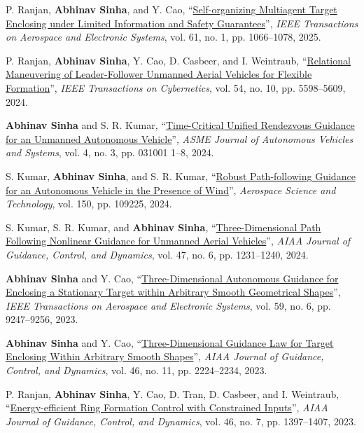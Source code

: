 \begin{etaremune}[leftmargin=1cm]
		\item P. Ranjan, \textbf{Abhinav Sinha}, and Y. Cao, ``\href{https://ieeexplore.ieee.org/document/10660561}{Self-organizing Multiagent Target Enclosing under Limited Information and Safety Guarantees}'', \emph{IEEE Transactions on Aerospace and Electronic Systems}, vol. 61, no. 1, pp. 1066--1078, 2025.
		\item P. Ranjan, \textbf{Abhinav Sinha}, Y. Cao, D. Casbeer, and I. Weintraub, ``\href{https://ieeexplore.ieee.org/abstract/document/10634571}{Relational Maneuvering of Leader-Follower Unmanned Aerial Vehicles for Flexible Formation}'', \emph{IEEE Transactions on Cybernetics}, vol. 54, no. 10, pp. 5598--5609, 2024.
		\item \textbf{Abhinav Sinha} and S. R. Kumar, ``\href{https://asmedigitalcollection.asme.org/autonomousvehicles/article-abstract/4/3/031001/1203074/Time-Critical-Unified-Rendezvous-Guidance-for-an?redirectedFrom=fulltext}{Time-Critical Unified Rendezvous Guidance for an Unmanned Autonomous Vehicle}'', \emph{ASME Journal of Autonomous Vehicles and Systems}, vol. 4, no. 3, pp. 031001 1--8, 2024.
		\item S. Kumar, \textbf{Abhinav Sinha}, and S. R. Kumar, ``\href{https://www.sciencedirect.com/science/article/abs/pii/S1270963824003560}{Robust Path-following Guidance for an Autonomous Vehicle in the Presence of Wind}'', \emph{Aerospace Science and Technology}, vol. 150, pp. 109225, 2024.
		\item S. Kumar, S. R. Kumar, and \textbf{Abhinav Sinha}, ``\href{https://arc.aiaa.org/doi/abs/10.2514/1.G007964}{Three-Dimensional Path Following Nonlinear Guidance for Unmanned Aerial Vehicles}'', \emph{AIAA Journal of Guidance, Control, and Dynamics}, vol. 47, no. 6, pp. 1231--1240, 2024.
		\item \textbf{Abhinav Sinha} and Y. Cao, ``\href{https://ieeexplore.ieee.org/document/10251969}{Three-Dimensional Autonomous Guidance for Enclosing a Stationary Target within Arbitrary Smooth Geometrical Shapes}'', \emph{IEEE Transactions on Aerospace and Electronic Systems}, vol. 59, no. 6, pp. 9247--9256, 2023.
		\item \textbf{Abhinav Sinha} and Y. Cao, ``\href{https://arc.aiaa.org/doi/abs/10.2514/1.G007539}{Three-Dimensional Guidance Law for Target Enclosing Within Arbitrary Smooth Shapes}'', \emph{AIAA Journal of Guidance, Control, and Dynamics}, vol. 46, no. 11, pp. 2224--2234, 2023.
		\item P. Ranjan, \textbf{Abhinav Sinha}, Y. Cao, D. Tran, D. Casbeer, and I. Weintraub, ``\href{https://arc.aiaa.org/doi/abs/10.2514/1.G007057}{Energy-efficient Ring Formation Control with Constrained Inputs}'', \emph{AIAA Journal of Guidance, Control, and Dynamics}, vol. 46, no. 7, pp. 1397--1407, 2023.

\end{etaremune}
